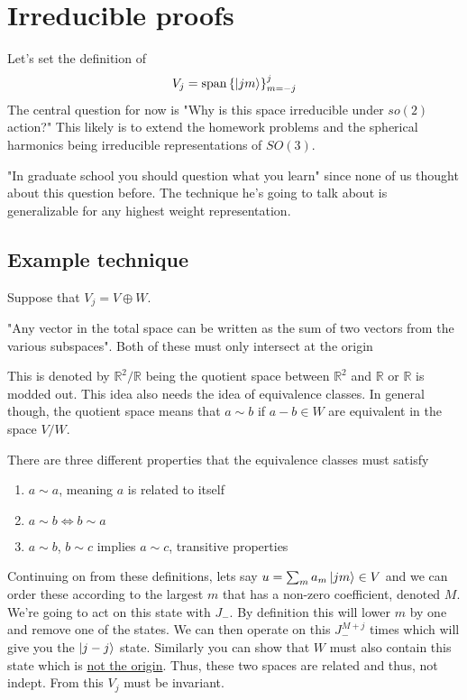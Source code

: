 \section{Irreducible proofs}
Let's set the definition of
$$
    V_j = \text{span}\left\{ \Ket{jm} \right\}_{m=-j}^j
$$
The central question for now is
"Why is this space irreducible under $so(2)$ action?"
This likely is to extend the homework problems and the spherical
harmonics being irreducible representations of $SO(3)$.

"In graduate school you should question what you learn" since none of us
thought about this question before. The technique
he's going to talk about is generalizable for any highest weight
representation.

\subsection{Example technique}
Suppose that $V_j = V \oplus W$. 
\begin{definition}
\label{directSum}
"Any vector in the total space can be written as the sum of two vectors from the
various subspaces". Both of these must only intersect at the origin
\end{definition}

\begin{definition}
\label{quotientSpace}
This is denoted by $\mathbb{R}^2 / \mathbb{R}$ being the quotient
space between $\mathbb{R}^2$ and $\mathbb{R}$ or $\mathbb{R}$ is modded out.
This idea also needs the idea of equivalence classes. In general though,
the quotient space means that $a \sim b$ if $a-b \in W$ are equivalent
in the space $V/W$.
\end{definition}

\begin{definition}
\label{equivalenceClass}
There are three different properties that the equivalence classes must satisfy
\begin{enumerate}
    \item $a \sim a$, meaning $a$ is related to itself
    \item $a \sim b \Leftrightarrow b \sim a$
    \item $a \sim b$, $b \sim c$ implies $a \sim c$, transitive properties
\end{enumerate}
\end{definition}

Continuing on from these definitions, lets say $u = \sum_m a_m \Ket{jm} \in V$ and we can
order these according to the largest $m$ that has a non-zero coefficient, denoted $M$.
We're going to act on this state with $J_-$. By definition this will lower $m$ by one
and remove one of the states. We can then operate on this 
$J_-^{M+j}$ times which will give you the $\Ket{j -j}$ state. Similarly you can show that
$W$ must also contain this state which is \underline{not the origin}. Thus, these
two spaces are related and thus, not indept. From this $V_j$ must be invariant.

